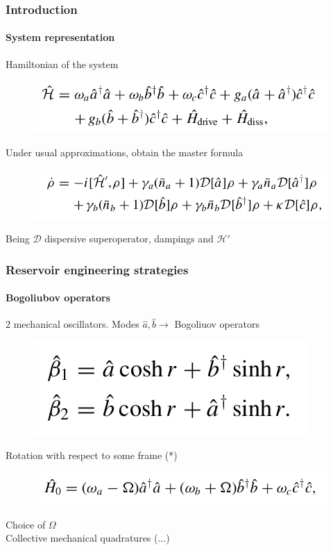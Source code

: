 \documentclass[aspectratio=43]{beamer}
\begin{document}
\begin{frame}
	
	\frametitle{Introduction}
	\framesubtitle{System representation}
	
	Hamiltonian of the system
	\begin{figure}
		\includegraphics[width = 8 cm]{plots/hamiltonian_1.png}
	\end{figure}
	
	Under usual approximations, obtain the master formula 
	\begin{figure}
		\includegraphics[width = 8 cm]{plots/master_eq_1.png}
	\end{figure}

	Being $\mathcal{D}$ dispersive superoperator, dampings and $\mathcal{H}'$
	
\end{frame}

\begin{frame}
	
	\frametitle{Reservoir engineering strategies}
	\framesubtitle{Bogoliubov operators}
	
	2 mechanical oscillators. Modes $\hat{a}, \hat{b} \longrightarrow$ Bogoliuov operators 
	\begin{figure}
		\includegraphics[width = 5 cm]{plots/bogoliubov_1.png}
	\end{figure}	

	Rotation with respect to some frame (*)
	\begin{figure}
		\includegraphics[width = 8 cm]{plots/hamiltonian_2.png}
	\end{figure}	

	Choice of $\Omega$ \\
	Collective mechanical quadratures (...)

\end{frame}
\end{document}
